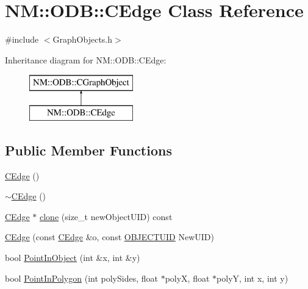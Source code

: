 \hypertarget{class_n_m_1_1_o_d_b_1_1_c_edge}{}\section{N\+M\+:\+:O\+D\+B\+:\+:C\+Edge Class Reference}
\label{class_n_m_1_1_o_d_b_1_1_c_edge}


{\ttfamily \#include $<$Graph\+Objects.\+h$>$}

Inheritance diagram for N\+M\+:\+:O\+D\+B\+:\+:C\+Edge\+:\begin{figure}[H]
\begin{center}
\leavevmode
\includegraphics[height=2.000000cm]{class_n_m_1_1_o_d_b_1_1_c_edge}
\end{center}
\end{figure}
\subsection*{Public Member Functions}
\begin{DoxyCompactItemize}
\item 
\hyperlink{class_n_m_1_1_o_d_b_1_1_c_edge_a42bdb065c2e6930e580eb5ce4af7736f}{C\+Edge} ()
\item 
\hyperlink{class_n_m_1_1_o_d_b_1_1_c_edge_a40c2bd301301d32a02251a6e6051b0f1}{$\sim$\+C\+Edge} ()
\item 
\hyperlink{class_n_m_1_1_o_d_b_1_1_c_edge}{C\+Edge} $\ast$ \hyperlink{class_n_m_1_1_o_d_b_1_1_c_edge_a34f284806ef8d5ebea50011032ec1914}{clone} (size\+\_\+t new\+Object\+U\+I\+D) const 
\item 
\hyperlink{class_n_m_1_1_o_d_b_1_1_c_edge_aba180d31769a4c9205fb0f445f9d1f87}{C\+Edge} (const \hyperlink{class_n_m_1_1_o_d_b_1_1_c_edge}{C\+Edge} \&o, const \hyperlink{namespace_n_m_1_1_o_d_b_a262b64fab56baaa96e18bac4ada88265}{O\+B\+J\+E\+C\+T\+U\+I\+D} New\+U\+I\+D)
\item 
bool \hyperlink{class_n_m_1_1_o_d_b_1_1_c_edge_ad232fb24c5a0077da58e45ef8a4399b9}{Point\+In\+Object} (int \&x, int \&y)
\item 
bool \hyperlink{class_n_m_1_1_o_d_b_1_1_c_edge_a406cfa223dd80dab9ad8643848c80edc}{Point\+In\+Polygon} (int poly\+Sides, float $\ast$poly\+X, float $\ast$poly\+Y, int x, int y)
\end{DoxyCompactItemize}

